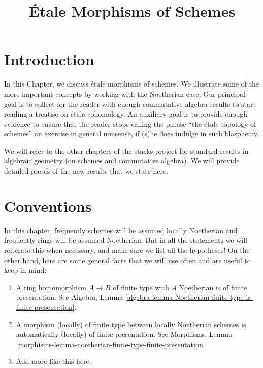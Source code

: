 

%


\title{\'Etale Morphisms of Schemes}

\maketitle

\label{section-phantom}

\tableofcontents



\section{Introduction}
\label{section-introduction}

\noindent
In this Chapter, we discuss \'etale morphisms of schemes. We illustrate
some of the more important concepts by working with the Noetherian case.
Our principal goal is to collect for the reader with enough commutative
algebra results to start reading a treatise on \'etale cohomology. An
auxiliary goal is to provide enough evidence to ensure that the reader stops
calling the phrase ``the \'etale topology of schemes'' an exercise in general
nonsense, if (s)he does indulge in such blasphemy.

\medskip\noindent
We will refer to the other
chapters of the stacks project for standard results in algebraic geometry
(on schemes and commutative algebra). We will provide detailed
proofs of the new results that we state here.




\section{Conventions}
\label{section-conventions}

\noindent
In this chapter, frequently schemes will be assumed locally Noetherian
and frequently rings will be assumed Noetherian. But in all the statements
we will reiterate this when necessary, and make sure we list all the
hypotheses! On the other hand, here are some general facts that we will use
often and are useful to keep in mind:
\begin{enumerate}
\item A ring homomorphism $A \to B$ of finite type with $A$ Noetherian
is of finite presentation. See Algebra,
Lemma \ref{algebra-lemma-Noetherian-finite-type-is-finite-presentation}.
\item A morphism (locally) of finite type between locally Noetherian schemes
is automatically (locally) of finite presentation.
See Morphisms,
Lemma \ref{morphisms-lemma-noetherian-finite-type-finite-presentation}.
\item Add more like this here.
\end{enumerate}




